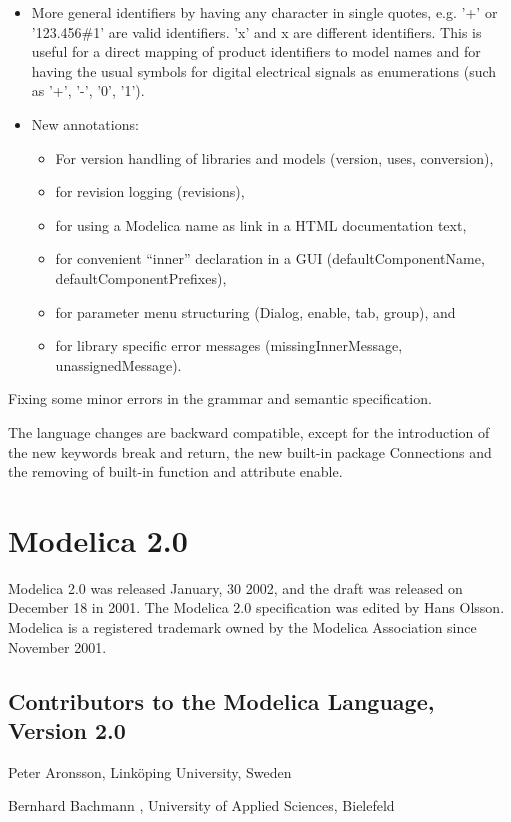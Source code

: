 \documentclass[10pt,a4paper]{report}
\def\doublelabel#1{\label{#1}}
\begin{document}
\begin{itemize}
\item
  More general identifiers by having any character in single quotes,
  e.g. '+' or '123.456\#1' are valid identifiers. 'x' and x are
  different identifiers. This is useful for a direct mapping of product
  identifiers to model names and for having the usual symbols for
  digital electrical signals as enumerations (such as '+', '-', '0',
  '1').
\item
  New annotations:
\begin{itemize}
\item For version handling of libraries and models (version, uses,
conversion),
\item for revision logging (revisions),
\item for using a Modelica name as link in a HTML documentation text,
\item for convenient ``inner'' declaration in a GUI (defaultComponentName,
defaultComponentPrefixes),
\item for parameter menu structuring (Dialog, enable, tab, group), and
\item for library specific error messages (missingInnerMessage,
unassignedMessage).
\end{itemize}
\end{itemize}
Fixing some minor errors in the grammar and semantic specification.

The language changes are backward compatible, except for the
introduction of the new keywords break and return, the new built-in
package Connections and the removing of built-in function and attribute
enable.

\section{Modelica 2.0}\doublelabel{modelica-2-0}

Modelica 2.0 was released January, 30 2002, and the draft was released
on December 18 in 2001. The Modelica 2.0 specification was edited by
Hans Olsson. Modelica is a registered trademark owned by the Modelica
Association since November 2001.

\subsection{Contributors to the Modelica Language, Version 2.0}\doublelabel{contributors-to-the-modelica-language-version-2-0}
\indent\indent
Peter Aronsson, Linköping University, Sweden

Bernhard Bachmann , University of Applied Sciences, Bielefeld
\end{document}
